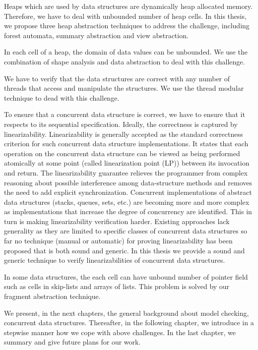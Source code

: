 \begin{challenges}
\item Heaps which are used by data structures are dynamically heap allocated memory. Therefore, we have to deal with unbounded number of heap cells. In this thesis, we propose three heap abstraction techniques to address the challenge, including forest automata, summary abstraction and view abstraction.
\item In each cell of a heap, the domain of data values can be unbounded. We use the combination of shape analysis and data abstraction to deal with this challenge. 
\item We have to verify that the data structures are correct with any number of threads that access and manipulate the structures. We use the thread modular technique to dead with this challenge.
\item To ensure that a concurrent data structure is correct, we have to ensure that it respects to its sequential specification.  Ideally, the correctness is captured by linearizability. Linearizability is generally accepted as the standard correctness criterion for such concurrent data structure implementations. It states that each operation on the concurrent data structure can be viewed as being performed atomically at some point (called linearization point (LP)) between its invocation and return. The linearizability guarantee relieves the programmer from complex reasoning about possible interference among data-structure methods and removes the need to add explicit synchronization. Concurrent implementations of abstract data structures (stacks, queues, sets, etc.) are becoming more and more complex as implementations that increase the degree of concurrency are identified. This in turn is making linearizability verification harder. Existing approaches lack generality as they are limited to specific classes of concurrent data structures so far no technique (manual or automatic) for proving linearizability has been proposed that is both sound and generic. In this thesis we provide a sound and generic technique to verify linearizabilities of concurrent data structures.
\item In some data structures, the each cell can have unbound number of pointer field such as cells in skip-lists and arrays of lists. This problem is solved by our fragment abstraction technique.
\end{challenges}

We present, in the next chapters, the general background about model checking, concurrent data structures. Thereafter, in the following chapter, we introduce in a stepwise manner how
we cope with  above challenges. In the last chapter, we summary and give future plans for our work.
